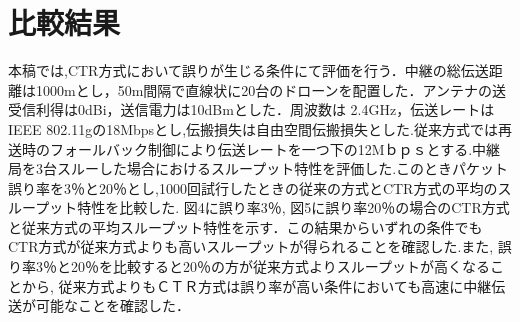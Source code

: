 \documentclass[a4paper,10pt]{ltjsarticle}
\begin{document}
\section{比較結果}
本稿では,CTR方式において誤りが生じる条件にて評価を行う．中継の総伝送距離は1000mとし，50m間隔で直線状に20台のドローンを配置した．アンテナの送受信利得は0dBi，送信電力は10dBmとした．周波数は 2.4GHz，伝送レートはIEEE 802.11gの18Mbpsとし,伝搬損失は自由空間伝搬損失とした.従来方式では再送時のフォールバック制御により伝送レートを一つ下の12Mｂｐｓとする.中継局を3台スルーした場合におけるスループット特性を評価した.このときパケット誤り率を3％と20％とし,1000回試行したときの従来の方式とCTR方式の平均のスループット特性を比較した.
図4に誤り率3％, 図5に誤り率20％の場合のCTR方式と従来方式の平均スループット特性を示す．この結果からいずれの条件でもCTR方式が従来方式よりも高いスループットが得られることを確認した.また, 誤り率3％と20％を比較すると20％の方が従来方式よりスループットが高くなることから, 従来方式よりもＣＴＲ方式は誤り率が高い条件においても高速に中継伝送が可能なことを確認した．
\end{document}
